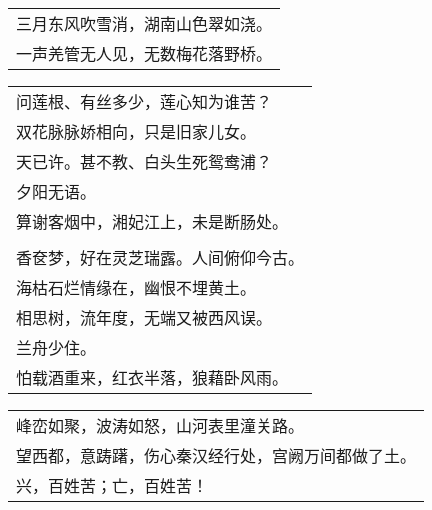 \nopagebreak%
\nopagebreak%
\noindent\begin{minipage}{\linewidth}
  \vskip-3pt\begin{table}[H]
    \centering
    \begin{tabular}{@{}l@{}}
三月东风吹雪消，湖南山色翠如浇。\\
一声羌管无人见，无数梅花落野桥。
    \end{tabular}
  \end{table}
\end{minipage}
\vspace{1cm}


\nopagebreak%
\nopagebreak%
\noindent\begin{minipage}{\linewidth}
  \vskip-3pt\begin{table}[H]
    \centering
    \begin{tabular}{@{}l@{}}
问莲根、有丝多少，莲心知为谁苦？\\
双花脉脉娇相向，只是旧家儿女。\\
天已许。甚不教、白头生死鸳鸯浦？\\
夕阳无语。\\
算谢客烟中，湘妃江上，未是断肠处。\\
\\
香奁梦，好在灵芝瑞露。人间俯仰今古。\\
海枯石烂情缘在，幽恨不埋黄土。\\
相思树，流年度，无端又被西风误。\\
兰舟少住。\\
怕载酒重来，红衣半落，狼藉卧风雨。
    \end{tabular}
  \end{table}
\end{minipage}
\vspace{1cm}


\nopagebreak%
\nopagebreak%
\noindent\begin{minipage}{\linewidth}
  \vskip-3pt\begin{table}[H]
    \centering
    \begin{tabular}{@{}l@{}}
峰峦如聚，波涛如怒，山河表里潼关路。\\
望西都，意踌躇，伤心秦汉经行处，宫阙万间都做了土。\\
兴，百姓苦；亡，百姓苦！
    \end{tabular}
  \end{table}
\end{minipage}
\vspace{1cm}


